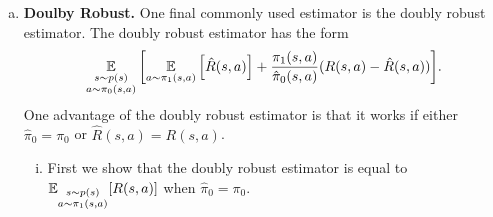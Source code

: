 \documentclass[12pt,letterpaper,boxed]{hmcpset}
\begin{document}
\begin{solution}
\begin{enumerate}[(a)]
    \begin{proof}
      When there is only a single data element $(s^*, a^*, R(s^*,a^*))$ in the observational dataset, we have
      \[
      \begin{aligned}
        & \E_{\substack{s \sim p(s) \\ a \sim \pi_0 (s,a)}}\qty[\frac{\pi_1(s,a)}{\hat \pi_0 (s,a)} R(s,a)] = \frac{\pi_1(s,a)}{\hat \pi_0 (s,a)} R(s^*,a^*), \\
        & \E_{\substack{s \sim p(s) \\ a \sim \pi_0 (s,a)}} \qty[\frac{\pi_1(s,a)}{\hat \pi_0 (s,a)}] = \frac{\pi_1(s,a)}{\hat \pi_0 (s,a)}.
      \end{aligned}
      \]
      The weighted importance estimator then gives
      \[
        \frac{\E_{\substack{s \sim p(s) \\ a \sim \pi_0 (s,a)}}\qty[\frac{\pi_1(s,a)}{\hat \pi_0 (s,a)} R(s,a)] }{ \E_{\substack{s \sim p(s) \\ a \sim \pi_0 (s,a)}}\qty[\frac{\pi_1(s,a)}{\hat \pi_0 (s,a)}] } = R(s^*,a^*) = \E_{\substack{s \sim p(s) \\ a \sim \pi_0 (s,a)}} [R(s,a)].
      \]
      If $\pi_1 \neq \pi_0$, that is, if $pi_1$ has nonzero probability taking any action $a \neq a^*$ at state $s^*$, then the weighted importance sampling estimator
      \[
        \frac{\E_{\substack{s \sim p(s) \\ a \sim \pi_0 (s,a)}}\qty[\frac{\pi_1(s,a)}{\hat \pi_0 (s,a)} R(s,a)] }{ \E_{\substack{s \sim p(s) \\ a \sim \pi_0 (s,a)}}\qty[\frac{\pi_1(s,a)}{\hat \pi_0 (s,a)}] } = \E_{\substack{s \sim p(s) \\ a \sim \pi_0 (s,a)}} [R(s,a)] \neq \E_{\substack{s \sim p(s) \\ a \sim \pi_1 (s,a)}} [R(s,a)],
      \]
      causing a bias.
    \end{proof}

    \item \textbf{Doulby Robust.} One final commonly used estimator is the doubly robust estimator. The doubly robust estimator has the form 
      \[
      \operatorname*{\mathbb{E}}_{\substack{s \sim p(s) \\ a \sim \pi_0(s,a)}} \qty[ \operatorname*{\mathbb{E}}_{a \sim \pi_1(s,a)} \qty[\hat R(s,a)] + \frac{\pi_1(s,a)}{\hat \pi_0 (s,a)} (R(s,a) - \hat R(s,a)) ].
      \]
      One advantage of the doubly robust estimator is that it works if either $\hat \pi_0 = \pi_0$ or $\hat R(s,a) = R(s,a)$.
      \begin{enumerate}[i.]
        \item First we show that the doubly robust estimator is equal to $\operatorname*{\mathbb{E}}_{\substack{s \sim p(s) \\ a \sim \pi_1(s,a)}} [R(s,a)]$ when $\hat \pi_0 = \pi_0$.
        

\end{enumerate}
\end{enumerate}
\end{solution}
\end{document}
